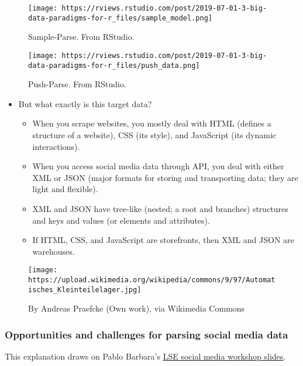 \documentclass[
]{book}
\begin{document}
\begin{figure}
\centering
\texttt{[image: https://rviews.rstudio.com/post/2019-07-01-3-big-data-paradigms-for-r\_files/sample\_model.png]}
\caption{Sample-Parse. From RStudio.}
\end{figure}

\begin{figure}
\centering
\texttt{[image: https://rviews.rstudio.com/post/2019-07-01-3-big-data-paradigms-for-r\_files/push\_data.png]}
\caption{Push-Parse. From RStudio.}
\end{figure}

\begin{itemize}
\item
  But what exactly is this target data?

  \begin{itemize}
  \item
    When you scrape websites, you mostly deal with HTML (defines a structure of a website), CSS (its style), and JavaScript (its dynamic interactions).
  \item
    When you access social media data through API, you deal with either XML or JSON (major formats for storing and transporting data; they are light and flexible).
  \item
    XML and JSON have tree-like (nested; a root and branches) structures and keys and values (or elements and attributes).
  \item
    If HTML, CSS, and JavaScript are storefronts, then XML and JSON are warehouses.
  \end{itemize}
\end{itemize}

\begin{figure}
\centering
\texttt{[image: https://upload.wikimedia.org/wikipedia/commons/9/97/Automatisches\_Kleinteilelager.jpg]}
\caption{By Andreas Praefcke (Own work), via Wikimedia Commons}
\end{figure}

\hypertarget{opportunities-and-challenges-for-parsing-social-media-data}{%
\subsubsection{Opportunities and challenges for parsing social media data}\label{opportunities-and-challenges-for-parsing-social-media-data}}

This explanation draws on Pablo Barbara's \href{http://pablobarbera.com/social-media-workshop/social-media-slides.pdf}{LSE social media workshop slides}.
\end{document}
